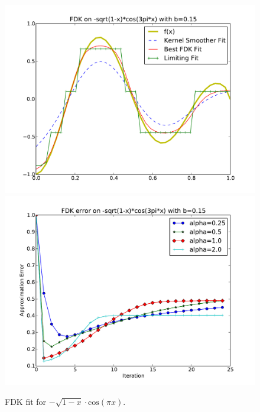 \begin{figure}[!htb]
    \includegraphics[width=\linewidth]{figs/chap4/sqcos.pdf}
  \endminipage\hfill
    \includegraphics[width=\linewidth]{figs/chap4/sqcoserr.pdf}
  \endminipage
\caption[Fitting $-\sqrt{1-x}\cdot\mathrm{cos}(\pi x)$]
{FDK fit for $-\sqrt{1-x}\cdot\mathrm{cos}(\pi x)$.}
\end{figure}

